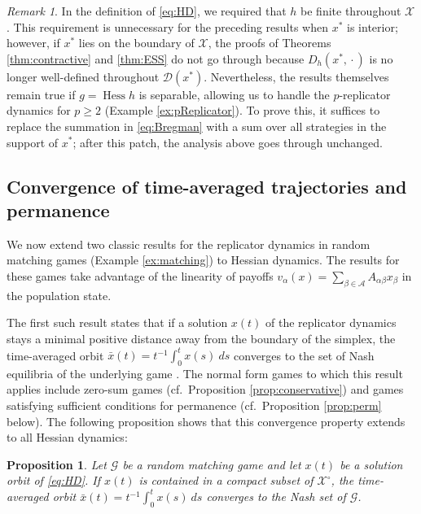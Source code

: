 \documentclass[reqno]{amsart}
\theoremstyle{plain}
\newtheorem{proposition}[theorem]{Proposition}
\theoremstyle{definition}
\theoremstyle{remark}
\newtheorem{remark}[theorem]{Remark}
\numberwithin{equation}{section}
\numberwithin{theorem}{section}
\begin{document}
\begin{remark}
\label{rem:GenHess}
In the definition of \eqref{eq:HD}, we required that $h$ be finite throughout ${\mathcal{X}}$.
This requirement is unnecessary for the preceding results when ${x^{\ast}}$ is interior;
however, if ${x^{\ast}}$ lies on the boundary of ${\mathcal{X}}$, the proofs of Theorems \ref{thm:contractive} and \ref{thm:ESS} do not go through because ${D_{h}}({x^{\ast}}, {\mathopen{}\cdot\mathopen{}})$ is no longer well-defined throughout ${\mathcal{D}}({x^{\ast}})$.
Nevertheless, the results themselves remain true if $g = \operatorname{Hess} h$ is separable, allowing us to handle the $p$-replicator dynamics for $p \geq 2$ (Example \ref{ex:pReplicator}).
To prove this, it suffices to replace the summation in \eqref{eq:Bregman} with a sum over all strategies in the support of ${x^{\ast}}$;
after this patch, the analysis above goes through unchanged.
\end{remark}

\subsection{Convergence of time-averaged trajectories and permanence}
\label{sec:averages}

We now extend two classic results for the replicator dynamics in random matching games (Example \ref{ex:matching}) to Hessian dynamics.
The results for these games take advantage of the linearity of payoffs ${v}_{\alpha}(x) = {\sum\nolimits}_{\beta\in{\mathcal{A}}} A_{\alpha\beta} x_{\beta}$ in the population state.

The first such result states that if a solution $x(t)$ of the replicator dynamics stays a minimal positive distance away from the boundary of the simplex, the time-averaged orbit
\(
\bar x(t)
	= t^{-1} \int_{0}^{t} x(s) {\:d} s
\)
converges to the set of Nash equilibria of the underlying game \citep{SSHW81}.
The normal form games to which this result applies include zero-sum games (cf.~Proposition \ref{prop:conservative}) and games satisfying sufficient conditions for permanence (cf.~Proposition \ref{prop:perm} below).
The following proposition shows that this convergence property extends to all Hessian dynamics:

\begin{proposition}
\label{prop:averages}
Let ${\mathcal{G}}$ be a random matching game and let $x(t)$ be a solution orbit of \eqref{eq:HD}.
If $x(t)$ is contained in a compact subset of ${{\mathcal{X}}^{\circ}}$, the time-averaged orbit $\bar x(t) = t^{-1} \int_{0}^{t} x(s) {\:d} s$ converges to the Nash set of ${\mathcal{G}}$.
\end{proposition}
\end{document}

